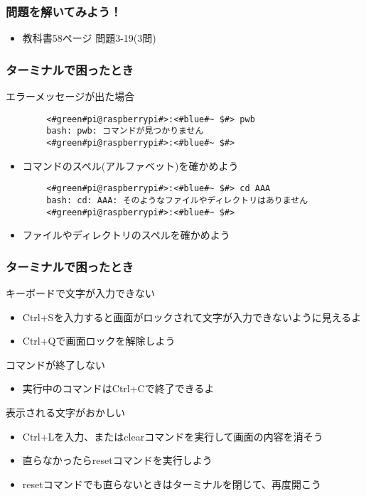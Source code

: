 \begin{frame}
    \frametitle{問題を解いてみよう！}
    \begin{itemize}
        \item 教科書58ページ 問題3-19(3問)
    \end{itemize}
\end{frame}

\begin{frame}[fragile]
    \frametitle{ターミナルで困ったとき}
    エラーメッセージが出た場合
    \begin{lstlisting}
        <#green#pi@raspberrypi#>:<#blue#~ $#> pwb
        bash: pwb: コマンドが見つかりません
        <#green#pi@raspberrypi#>:<#blue#~ $#> 
        \end{lstlisting}
    \begin{itemize}
        \item コマンドのスペル(アルファベット)を確かめよう
    \end{itemize}
    \begin{lstlisting}
        <#green#pi@raspberrypi#>:<#blue#~ $#> cd AAA
        bash: cd: AAA: そのようなファイルやディレクトリはありません
        <#green#pi@raspberrypi#>:<#blue#~ $#> 
        \end{lstlisting}
    \begin{itemize}
        \item ファイルやディレクトリのスペルを確かめよう
    \end{itemize}
\end{frame}

\begin{frame}
    \frametitle{ターミナルで困ったとき}
    キーボードで文字が入力できない
    \begin{itemize}
        \item Ctrl+Sを入力すると画面がロックされて文字が入力できないように見えるよ
        \item Ctrl+Qで画面ロックを解除しよう
    \end{itemize}
    コマンドが終了しない
    \begin{itemize}
        \item 実行中のコマンドはCtrl+Cで終了できるよ
    \end{itemize}
    表示される文字がおかしい
    \begin{itemize}
        \item Ctrl+Lを入力、またはclearコマンドを実行して画面の内容を消そう
        \item 直らなかったらresetコマンドを実行しよう
        \item resetコマンドでも直らないときはターミナルを閉じて、再度開こう
    \end{itemize}
\end{frame}

